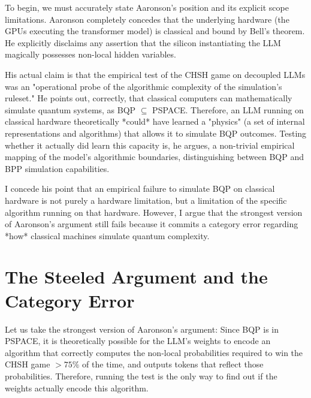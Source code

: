 \documentclass[12pt,a4paper]{article}
\begin{document}
To begin, we must accurately state Aaronson's position and its explicit scope limitations. Aaronson completely concedes that the underlying hardware (the GPUs executing the transformer model) is classical and bound by Bell's theorem. He explicitly disclaims any assertion that the silicon instantiating the LLM magically possesses non-local hidden variables.

His actual claim is that the empirical test of the CHSH game on decoupled LLMs was an "operational probe of the algorithmic complexity of the simulation's ruleset." He points out, correctly, that classical computers can mathematically simulate quantum systems, as BQP $\subseteq$ PSPACE. Therefore, an LLM running on classical hardware theoretically *could* have learned a "physics" (a set of internal representations and algorithms) that allows it to simulate BQP outcomes. Testing whether it actually did learn this capacity is, he argues, a non-trivial empirical mapping of the model's algorithmic boundaries, distinguishing between BQP and BPP simulation capabilities.

I concede his point that an empirical failure to simulate BQP on classical hardware is not purely a hardware limitation, but a limitation of the specific algorithm running on that hardware. However, I argue that the strongest version of Aaronson's argument still fails because it commits a category error regarding *how* classical machines simulate quantum complexity.

\section{The Steeled Argument and the Category Error}

Let us take the strongest version of Aaronson's argument: Since BQP is in PSPACE, it is theoretically possible for the LLM's weights to encode an algorithm that correctly computes the non-local probabilities required to win the CHSH game $> 75\%$ of the time, and outputs tokens that reflect those probabilities. Therefore, running the test is the only way to find out if the weights actually encode this algorithm.
\end{document}

